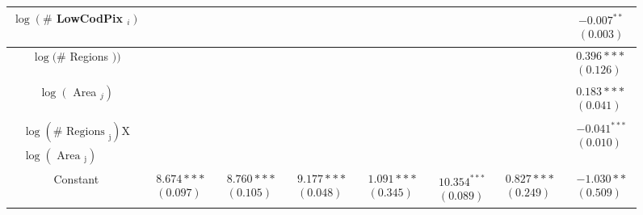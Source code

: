 \documentclass[10pt]{article}
\begin{document}
\begin{center}
\begin{tabular}{|c|c|c|c|c|c|c|c|}
\hline
$\log \left(\#\right.$ LowCodPix $\left._{i}\right)$ &  &  &  &  &  &  & $\begin{array}{l}-0.007^{* *} \\ (0.003)\end{array}$ \\
\hline
$\log (\#$ Regions $))$ &  &  &  &  &  &  & $\begin{array}{l}0.396 * * * \\ (0.126)\end{array}$ \\
\hline
$\log \left(\right.$ Area $\left._{j}\right)$ &  &  &  &  &  &  & $\begin{array}{l}0.183 * * * \\ (0.041)\end{array}$ \\
\hline
$\begin{array}{l}\log \left(\# \text { Regions }_{\mathrm{j}}\right) \mathrm{X} \\ \log \left(\text { Area }_{\mathrm{j}}\right)\end{array}$ &  &  &  &  &  &  & $\begin{array}{l}-0.041^{* * *} \\ (0.010)\end{array}$ \\
\hline
Constant & $\begin{array}{l}8.674 * * * \\ (0.097)\end{array}$ & $\begin{array}{l}8.760 * * * \\ (0.105)\end{array}$ & $\begin{array}{l}9.177 * * * \\ (0.048)\end{array}$ & $\begin{array}{l}1.091 * * * \\ (0.345)\end{array}$ & $\begin{array}{l}10.354^{* * *} \\ (0.089)\end{array}$ & $\begin{array}{l}0.827 * * * \\ (0.249)\end{array}$ & $\begin{array}{l}-1.030 * * \\ (0.509)\end{array}$ \\

\end{tabular}
\end{center}
\end{document}
